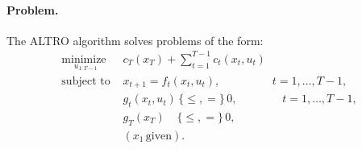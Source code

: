 \paragraph{Problem.} The ALTRO algorithm solves problems of the form:
\begin{equation}
	\begin{array}{ll}
		\underset{u_{1:T-1}}{\mbox{minimize }} & c_T(x_T) + \sum \limits_{t = 1}^{T-1} c_t(x_t, u_t)\\
		\mbox{subject to } & x_{t+1} = f_t(x_t, u_t),\phantom{\mathcal{K},} \quad \quad \quad \, t = 1,\dots,T-1,\\
		& g_t(x_t, u_t) \, \{\leq,=\}\, 0,\phantom{\,_{t+1}\mathcal{K}_t}\quad t = 1, \dots, T - 1,\\
		& g_T(x_T)\phantom{u_t} \, \{\leq,=\}\, 0, \\
		& (x_1 \, \text{given}). \label{altro_problem}
	\end{array}
\end{equation}

